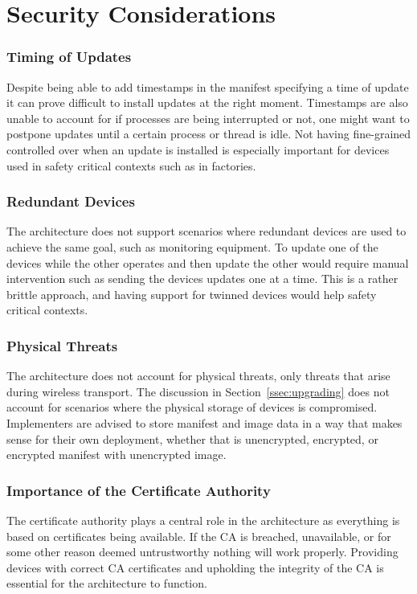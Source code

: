 \documentclass[0-thesis.tex]{subfiles}
\begin{document}
\section{Security Considerations}
\label{sec:security-considerations}

\subsubsection{Timing of Updates}
Despite being able to add timestamps in the manifest specifying a time of update it can
prove difficult to install updates at the right moment. Timestamps are also unable to
account for if processes are being interrupted or not, one might want to postpone updates
until a certain process or thread is idle. Not having fine-grained controlled over when an
update is installed is especially important for devices used in safety critical contexts
such as in factories.

\subsubsection{Redundant Devices}
The architecture does not support scenarios where redundant devices are used to achieve
the same goal, such as monitoring equipment. To update one of the devices while the other
operates and then update the other would require manual intervention such as sending the
devices updates one at a time. This is a rather brittle approach, and having support for
twinned devices would help safety critical contexts.

\subsubsection{Physical Threats}
The architecture does not account for physical threats, only threats that arise during
wireless transport. The discussion in Section~\ref{ssec:upgrading} does not account for
scenarios where the physical storage of devices is compromised. Implementers are advised
to store manifest and image data in a way that makes sense for their own deployment,
whether that is unencrypted, encrypted, or encrypted manifest with unencrypted image.

\subsubsection{Importance of the Certificate Authority}
The certificate authority plays a central role in the architecture as everything is based
on certificates being available. If the CA is breached, unavailable, or for some other
reason deemed untrustworthy nothing will work properly. Providing devices with correct CA
certificates and upholding the integrity of the CA is essential for the architecture to
function.
\end{document}
